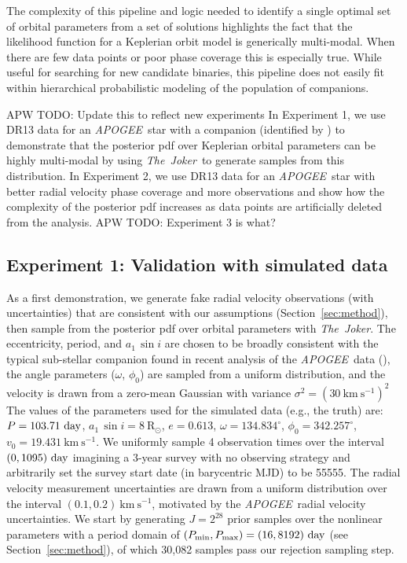 \documentclass[manuscript, letterpaper]{aastex6}
\newcommand{\project}[1]{\textsl{#1}}
\newcommand{\acronym}[1]{{\small{#1}}}
\newcommand{\apogee}{\project{\acronym{APOGEE}}}
\newcommand{\samplername}{\project{The~Joker}}
\newcommand{\sectionname}{Section}
\newcommand{\asini}{\ensuremath{a_1\,\sin i}}
\newcommand{\rsun}{\mathrm{R}_\odot}
\newcommand{\kms}{\mathrm{km}~\mathrm{s}^{-1}}
\newcommand{\todoapw}[1]{{\color{red}APW TODO: #1}}
\begin{document}
The complexity of this pipeline and logic needed to identify a single optimal
set of orbital parameters from a set of solutions highlights the fact that the
likelihood function for a Keplerian orbit model is generically multi-modal.
When there are few data points or poor phase coverage this is especially true.
While useful for searching for new candidate binaries, this pipeline does not
easily fit within hierarchical probabilistic modeling of the population of
companions.

\todoapw{Update this to reflect new experiments}
In Experiment 1, we use DR13 data for an \apogee\ star with a companion
(identified by \citealt{Troup:2016}) to demonstrate that the posterior pdf over
Keplerian orbital parameters can be highly multi-modal by using \samplername\
to generate samples from this distribution.
In Experiment 2, we use DR13 data for an \apogee\ star with better radial
velocity phase coverage and more observations and show how the complexity of
the posterior pdf increases as data points are artificially deleted from the
analysis.
\todoapw{Experiment 3 is what?}

\subsection{Experiment 1: Validation with simulated data}

As a first demonstration, we generate fake radial velocity observations (with
uncertainties) that are consistent with our assumptions
(\sectionname~\ref{sec:method}), then sample from the posterior pdf over orbital
parameters with \samplername.
The eccentricity, period, and $\asini$ are chosen to be broadly consistent with
the typical sub-stellar companion found in recent analysis of the \apogee\ data
(\citealt{Troup:2016}), the angle parameters ($\omega$, $\phi_0$) are sampled
from a uniform distribution, and the velocity is drawn from a zero-mean Gaussian
with variance $\sigma^2 = (30~\kms)^2$
The values of the parameters used for the simulated data (e.g., the truth) are:
$P = 103.71~{\rm day}$, $\asini = 8~\rsun$, $e = 0.613$, $\omega =
134.834^\circ$, $\phi_0 = 342.257^\circ$, $v_0 = 19.431~\kms$.
We uniformly sample 4 observation times over the interval $(0,1095)~{\rm day}$
imagining a 3-year survey with no observing strategy and arbitrarily set the
survey start date (in barycentric MJD) to be 55555.
The radial velocity measurement uncertainties are drawn from a uniform
distribution over the interval $(0.1, 0.2)~\kms$, motivated by the \apogee\
radial velocity uncertainties.
We start by generating $J=2^{28}$ prior samples over the nonlinear parameters
with a period domain of $(P_{\rm min}, P_{\rm max}) = (16, 8192)~{\rm day}$ (see
\sectionname~\ref{sec:method}), of which 30,082 samples pass our rejection
sampling step.
\end{document}

